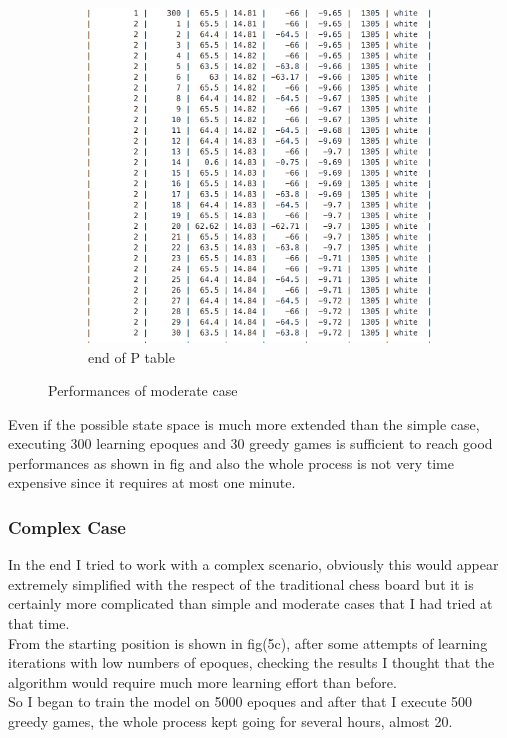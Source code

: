 \documentclass{article}
\begin{document}
\begin{figure}[h!]
\begin{subfigure}{0.50\textwidth}
                \includegraphics[width=\linewidth]{moderate_ptable_fin}
                \caption{end of P table}
        \end{subfigure}\qquad
        \caption{Performances of moderate case}
 		\label{fig:10}
 		\end{figure}
 		Even if the possible state space is much more extended than the simple case, executing 300 learning epoques and 30 greedy games is sufficient to reach good performances as shown in fig and also the whole process is not very time expensive since it requires at most one minute.


				\subsubsection{Complex Case}
				In the end I tried to work with a complex scenario, obviously this would appear extremely simplified with the respect of the traditional chess board but it is certainly more complicated than simple and moderate cases that I had tried at that time.\medskip\\
				From the starting position is shown in fig(5c), after some attempts of learning iterations with low numbers of epoques, checking the results I thought that the algorithm would require much more learning effort than before.\smallskip\\
				So I began to train the model on 5000 epoques and after that I execute 500 greedy games, the whole process kept going for several hours, almost 20.\smallskip\\
\end{document}
